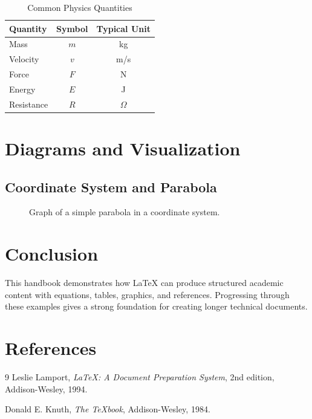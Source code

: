 \documentclass[11pt]{article}
\begin{document}
\begin{table}[h!]
    \centering
    \caption{Common Physics Quantities}
    \begin{tabular}{@{} lcc @{}}
        \toprule
        Quantity & Symbol & Typical Unit \\
        \midrule
        Mass & $m$ & kg \\
        Velocity & $v$ & m/s \\
        Force & $F$ & N \\
        Energy & $E$ & J \\
        Resistance & $R$ & $\Omega$ \\
        \bottomrule
    \end{tabular}
\end{table}

\newpage

\section{Diagrams and Visualization}
\subsection{Coordinate System and Parabola}
\begin{figure}[h!]
    \centering
    \caption{Graph of a simple parabola in a coordinate system.}
\end{figure}

\section{Conclusion}
This handbook demonstrates how LaTeX can produce structured academic content with equations, tables, graphics, and references. Progressing through these examples gives a strong foundation for creating longer technical documents.

\section*{References}
\begin{thebibliography}{9}
    Leslie Lamport,
    \textit{\LaTeX: A Document Preparation System},
    2nd edition, Addison-Wesley, 1994.

    Donald E. Knuth,
    \textit{The \TeX book},
    Addison-Wesley, 1984.
\end{thebibliography}
\end{document}
